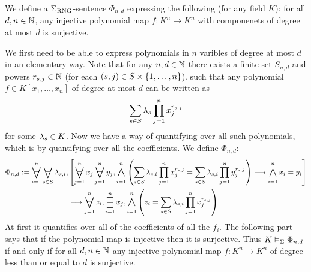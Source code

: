\begin{dfn}
    We define a $\Sigma_{\mathrm{RNG}}$-sentence $\Phi_{n,d}$ expressing the following
    (for any field $K$):
    for all $d,n \in \mathbb{N}$, any injective polynomial map $f : K^n \to K^n$
    with componenets of degree at most $d$ is surjective.

    We first need to be able to express polynomials in $n$ varibles 
    of degree at most $d$ in an elementary way.
    Note that for any $n,d \in \mathbb{N}$ there exists a finite set $S_{n,d}$
    and powers $r_{s,j}\in \mathbb{N}$ (for each $(s,j) \in S \times \left\{1, \dots, n\right\}$).
    such that any polynomial $f \in K[x_1, \dots, x_n]$
    of degree at most $d$ can be written as
    \[\sum_{s \in S} \lambda_s \prod_{j=1}^n x_j^{r_{s,j}}\]
    for some $\lambda_s \in K$.
    Now we have a way of quantifying over all such polynomials,
    which is by quantifying over all the coefficients.
    We define $\Phi_{n,d}$:
    \begin{align*}
        \Phi_{n,d}:= \bigforall{i = 1}{n} \bigforall{s \in S}{} \la_{s,i},
        &\sqbrkt{\bigforall{j = 1}{n}x_j \bigforall{j = 1}{n}y_j,
        \bigand{i = 1}{n} \brkt{
            \sum_{s \in S}\la_{s,i}\prod_{j = 1}^{n} x_j^{r_{s,j}} = 
            \sum_{s \in S}\la_{s,i}\prod_{j = 1}^{n} y_j^{r_{s,j}}
         }
         \longrightarrow \bigand{i = 1}{n} x_i = y_i}\\
         &\longrightarrow \bigforall{j = 1}{n} z_i, \bigexists{i = 1}{n} x_j,
         \bigand{i=1}{n}\brkt{z_i = \sum_{s \in S} 
         \la_{s,i}\prod_{j = 1}^{n} x_j^{r_{s,j}}
         }
    \end{align*}
    At first it quantifies over all of the coefficients of all the $f_i$.
    The following part says that if the polynomial map is injective then 
    it is surjective.
    Thus $K \vDash_{\Sigma} \Phi_{n,d}$ if and only if
    for all $d,n \in \mathbb{N}$ any injective polynomial map $f : K^n \to K^n$
    of degree less than or equal to $d$ is surjective.
\end{dfn}

